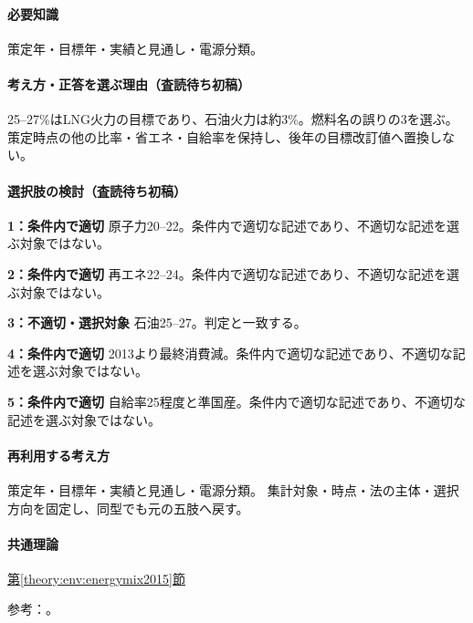 \paragraph{必要知識} 策定年・目標年・実績と見通し・電源分類。

\paragraph{考え方・正答を選ぶ理由（査読待ち初稿）} 25–27\%はLNG火力の目標であり、石油火力は約3\%。燃料名の誤りの3を選ぶ。策定時点の他の比率・省エネ・自給率を保持し、後年の目標改訂値へ置換しない。

\paragraph{選択肢の検討（査読待ち初稿）}\mbox{}\par

\noindent\textbf{1：条件内で適切} 原子力20–22。条件内で適切な記述であり、不適切な記述を選ぶ対象ではない。\par

\noindent\textbf{2：条件内で適切} 再エネ22–24。条件内で適切な記述であり、不適切な記述を選ぶ対象ではない。\par

\noindent\textbf{3：不適切・選択対象} 石油25–27。判定と一致する。\par

\noindent\textbf{4：条件内で適切} 2013より最終消費減。条件内で適切な記述であり、不適切な記述を選ぶ対象ではない。\par

\noindent\textbf{5：条件内で適切} 自給率25程度と準国産。条件内で適切な記述であり、不適切な記述を選ぶ対象ではない。\par

\paragraph{再利用する考え方} 策定年・目標年・実績と見通し・電源分類。 集計対象・時点・法の主体・選択方向を固定し、同型でも元の五肢へ戻す。

\paragraph{共通理論} \hyperref[theory:env:energymix2015]{第\ref*{theory:env:energymix2015}節}

\par 参考：\cite{env58_mix2015}。

